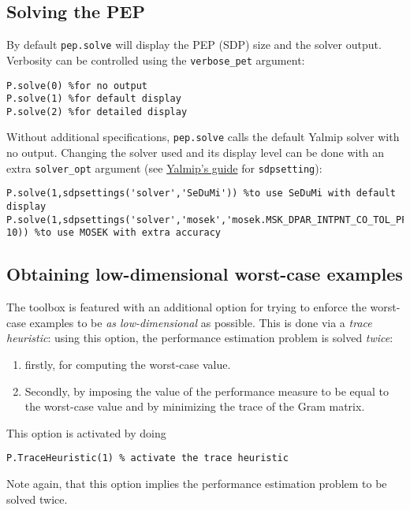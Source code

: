 \documentclass[11pt,a4paper]{article}
\begin{document}
				\subsection{Solving the PEP}
				By default \verb|pep.solve| will display the PEP (SDP) size and the solver output.
				Verbosity can be controlled using the \verb?verbose_pet? argument:
				\begin{lstlisting}
P.solve(0) %for no output
P.solve(1) %for default display
P.solve(2) %for detailed display
				\end{lstlisting}
				Without additional specifications, \verb|pep.solve| calls the default Yalmip solver with no output.
				Changing the solver used and its display level can be done with an extra \verb|solver_opt| argument (see \href{https://yalmip.github.io/command/sdpsettings/}{Yalmip's guide} for \verb|sdpsetting|):
				\begin{lstlisting}
P.solve(1,sdpsettings('solver','SeDuMi')) %to use SeDuMi with default display
P.solve(1,sdpsettings('solver','mosek','mosek.MSK_DPAR_INTPNT_CO_TOL_PFEAS',1e-10)) %to use MOSEK with extra accuracy
				\end{lstlisting}
				\subsection{Obtaining low-dimensional worst-case examples}
				The toolbox is featured with an additional option for trying to enforce the worst-case examples to be \emph{as low-dimensional} as possible.
				This is done via a \emph{trace heuristic}: using this option, the performance estimation problem is solved \emph{twice}:
				\begin{enumerate}
					\item firstly, for computing the worst-case value.
					\item Secondly, by imposing the value of the performance measure to be equal to the worst-case value and by minimizing the trace of the Gram matrix.
				\end{enumerate}
				This option is activated by doing
				\begin{lstlisting}
P.TraceHeuristic(1) % activate the trace heuristic
				\end{lstlisting}
				Note again, that this option implies the performance estimation problem to be solved twice.
\end{document}
